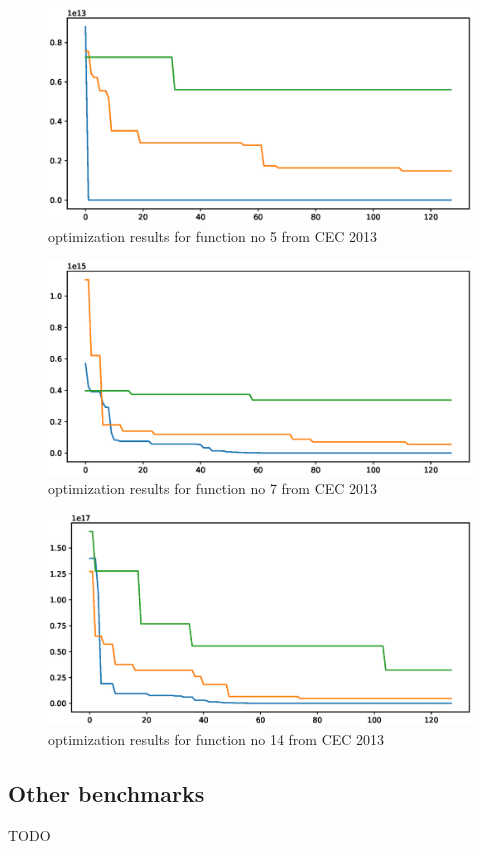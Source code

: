 \documentclass[11pt,a4paper]{article}
\begin{document}
\begin{figure}[H]
	\centering
	\includegraphics[scale=0.6]{cec2013_2.eps}
	\caption{optimization results for function no 5 from CEC 2013}
\end{figure}

\begin{figure}[H]
	\centering
	\includegraphics[scale=0.6]{cec2013_3.eps}
	\caption{optimization results for function no 7 from CEC 2013}
\end{figure}

\begin{figure}[H]
	\centering
	\includegraphics[scale=0.6]{cec2013_4.eps}
	\caption{optimization results for function no 14 from CEC 2013}
\end{figure}

\subsection{Other benchmarks}\label{subsec:other_testing}
TODO
\end{document}
